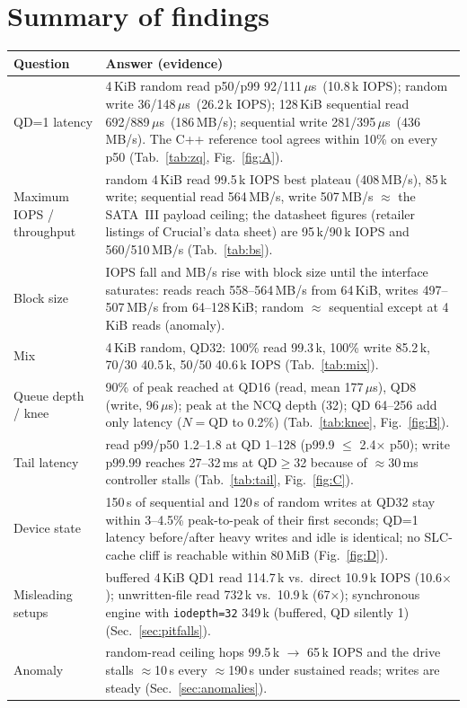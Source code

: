 ﻿\documentclass[10.5pt]{article}
\newcommand{\us}{\,$\mu$s}
\begin{document}
\section{Summary of findings}
\begin{center}\small
\begin{tabular}{p{3.3cm}p{12.5cm}}
\toprule
\textbf{Question} & \textbf{Answer (evidence)} \\
\midrule
QD=1 latency & 4\,KiB random read p50/p99 92/111\us\ (10.8\,k IOPS); random write 36/148\us\ (26.2\,k IOPS); 128\,KiB sequential read 692/889\us\ (186\,MB/s); sequential write 281/395\us\ (436\,MB/s). The C++ reference tool agrees within 10\% on every p50 (Tab.~\ref{tab:zq}, Fig.~\ref{fig:A}). \\
Maximum IOPS / throughput & random 4\,KiB read 99.5\,k IOPS best plateau (408\,MB/s), 85\,k write; sequential read 564\,MB/s, write 507\,MB/s $\approx$ the SATA~III payload ceiling; the datasheet figures (retailer listings of Crucial's data sheet) are 95\,k/90\,k IOPS and 560/510\,MB/s (Tab.~\ref{tab:bs}). \\
Block size & IOPS fall and MB/s rise with block size until the interface saturates: reads reach 558--564\,MB/s from 64\,KiB, writes 497--507\,MB/s from 64--128\,KiB; random $\approx$ sequential except at 4\,KiB reads (anomaly). \\
Mix & 4\,KiB random, QD32: 100\% read 99.3\,k, 100\% write 85.2\,k, 70/30 40.5\,k, 50/50 40.6\,k IOPS (Tab.~\ref{tab:mix}). \\
Queue depth / knee & 90\% of peak reached at QD16 (read, mean 177\us), QD8 (write, 96\us); peak at the NCQ depth (32); QD 64--256 add only latency ($N=\text{QD}$ to 0.2\%) (Tab.~\ref{tab:knee}, Fig.~\ref{fig:B}). \\
Tail latency & read p99/p50 1.2--1.8 at QD 1--128 (p99.9 $\le$ 2.4$\times$ p50); write p99.99 reaches 27--32\,ms at QD$\ge$32 because of $\approx$30\,ms controller stalls (Tab.~\ref{tab:tail}, Fig.~\ref{fig:C}). \\
Device state & 150\,s of sequential and 120\,s of random writes at QD32 stay within 3--4.5\% peak-to-peak of their first seconds; QD=1 latency before/after heavy writes and idle is identical; no SLC-cache cliff is reachable within 80\,MiB (Fig.~\ref{fig:D}). \\
Misleading setups & buffered 4\,KiB QD1 read 114.7\,k vs.\ direct 10.9\,k IOPS (10.6$\times$); unwritten-file read 732\,k vs.\ 10.9\,k (67$\times$); synchronous engine with \texttt{iodepth=32} 349\,k (buffered, QD silently 1) (Sec.~\ref{sec:pitfalls}). \\
Anomaly & random-read ceiling hops 99.5\,k $\rightarrow$ 65\,k IOPS and the drive stalls $\approx$10\,s every $\approx$190\,s under sustained reads; writes are steady (Sec.~\ref{sec:anomalies}). \\
\bottomrule
\end{tabular}
\end{center}
\end{document}
